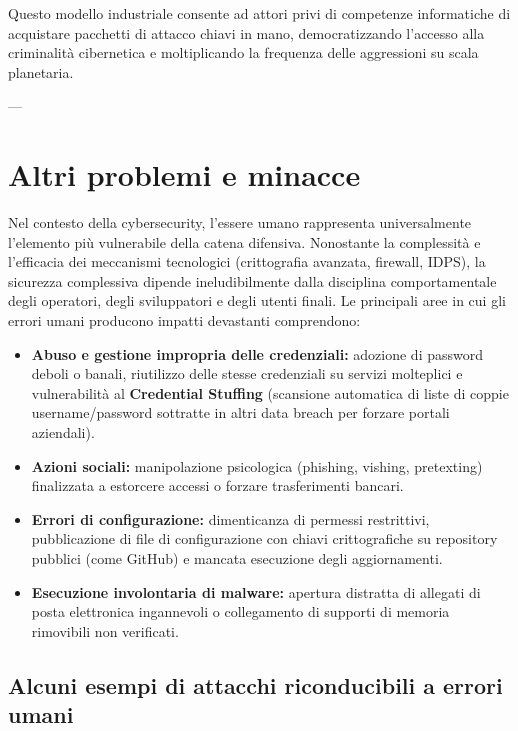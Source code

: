 \documentclass[../../main.tex]{subfiles}
\begin{document}
Questo modello industriale consente ad attori privi di competenze informatiche di acquistare pacchetti di attacco chiavi in mano, democratizzando l'accesso alla criminalità cibernetica e moltiplicando la frequenza delle aggressioni su scala planetaria.

---

\section{Altri problemi e minacce}
\label{sec:altri_problemi}

Nel contesto della cybersecurity, l'essere umano rappresenta universalmente l'elemento più vulnerabile della catena difensiva. Nonostante la complessità e l'efficacia dei meccanismi tecnologici (crittografia avanzata, firewall, IDPS), la sicurezza complessiva dipende ineludibilmente dalla disciplina comportamentale degli operatori, degli sviluppatori e degli utenti finali. Le principali aree in cui gli errori umani producono impatti devastanti comprendono:
\begin{itemize}
    \item \textbf{Abuso e gestione impropria delle credenziali:} adozione di password deboli o banali, riutilizzo delle stesse credenziali su servizi molteplici e vulnerabilità al \textbf{Credential Stuffing} (scansione automatica di liste di coppie username/password sottratte in altri data breach per forzare portali aziendali).
    \item \textbf{Azioni sociali:} manipolazione psicologica (phishing, vishing, pretexting) finalizzata a estorcere accessi o forzare trasferimenti bancari.
    \item \textbf{Errori di configurazione:} dimenticanza di permessi restrittivi, pubblicazione di file di configurazione con chiavi crittografiche su repository pubblici (come GitHub) e mancata esecuzione degli aggiornamenti.
    \item \textbf{Esecuzione involontaria di malware:} apertura distratta di allegati di posta elettronica ingannevoli o collegamento di supporti di memoria rimovibili non verificati.
\end{itemize}

\subsection{Alcuni esempi di attacchi riconducibili a errori umani}
\label{subsec:esempi_errori_umani}
\end{document}
